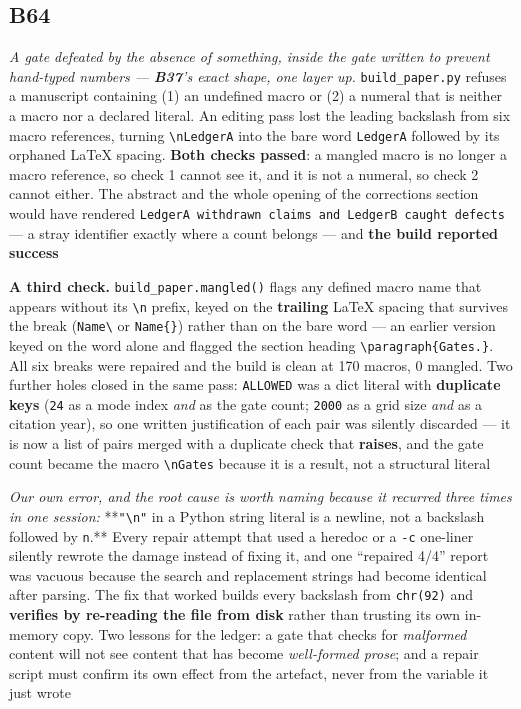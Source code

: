 \documentclass[10pt]{article}
\begin{document}
\subsection*{B64}\label{led:B64}
\begin{description}[leftmargin=0pt,itemsep=1pt]
\item[Defect.] \emph{A gate defeated by the absence of something, inside the gate written to prevent hand-typed numbers --- \textbf{B37}'s exact shape, one layer up.} \texttt{build\_paper.py} refuses a manuscript containing (1) an undefined macro or (2) a numeral that is neither a macro nor a declared literal. An editing pass lost the leading backslash from six macro references, turning \texttt{\textbackslash{}nLedgerA} into the bare word \texttt{LedgerA} followed by its orphaned LaTeX spacing. \textbf{Both checks passed}: a mangled macro is no longer a macro reference, so check 1 cannot see it, and it is not a numeral, so check 2 cannot either. The abstract and the whole opening of the corrections section would have rendered \texttt{LedgerA withdrawn claims and LedgerB caught defects} --- a stray identifier exactly where a count belongs --- and \textbf{the build reported success}
\item[Resolution.] \textbf{A third check.} \texttt{build\_paper.mangled()} flags any defined macro name that appears without its \texttt{\textbackslash{}n} prefix, keyed on the \textbf{trailing} LaTeX spacing that survives the break (\texttt{Name\textbackslash{}} or \texttt{Name\{\}}) rather than on the bare word --- an earlier version keyed on the word alone and flagged the section heading \texttt{\textbackslash{}paragraph\{Gates.\}}. All six breaks were repaired and the build is clean at 170 macros, 0 mangled. Two further holes closed in the same pass: \texttt{ALLOWED} was a dict literal with \textbf{duplicate keys} (\texttt{24} as a mode index \emph{and} as the gate count; \texttt{2000} as a grid size \emph{and} as a citation year), so one written justification of each pair was silently discarded --- it is now a list of pairs merged with a duplicate check that \textbf{raises}, and the gate count became the macro \texttt{\textbackslash{}nGates} because it is a result, not a structural literal
\item[Note.] \emph{Our own error, and the root cause is worth naming because it recurred three times in one session:} **\texttt{"\textbackslash{}n"} in a Python string literal is a newline, not a backslash followed by \texttt{n}.** Every repair attempt that used a heredoc or a \texttt{-c} one-liner silently rewrote the damage instead of fixing it, and one ``repaired 4/4'' report was vacuous because the search and replacement strings had become identical after parsing. The fix that worked builds every backslash from \texttt{chr(92)} and \textbf{verifies by re-reading the file from disk} rather than trusting its own in-memory copy. Two lessons for the ledger: a gate that checks for \emph{malformed} content will not see content that has become \emph{well-formed prose}; and a repair script must confirm its own effect from the artefact, never from the variable it just wrote
\end{description}
\end{document}
